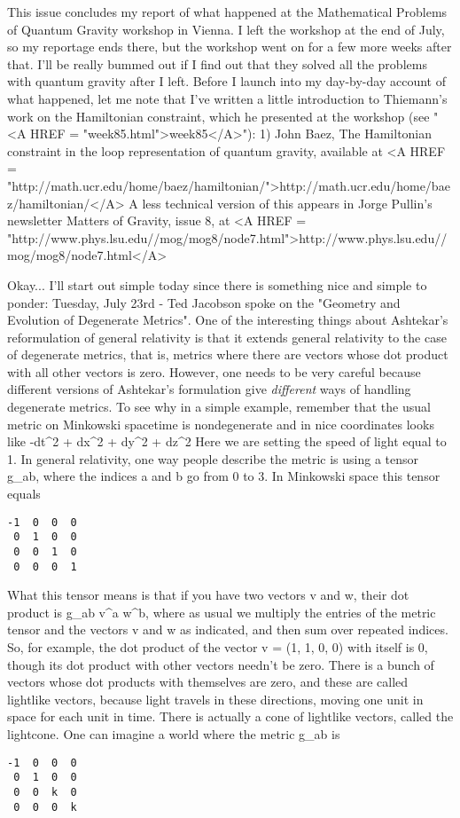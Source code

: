 

This issue concludes my report of what happened at the
Mathematical Problems of Quantum Gravity workshop in Vienna.  I
left the workshop at the end of July, so my reportage ends there,
but the workshop went on for a few more weeks after that.  I'll
be really bummed out if I find out that they solved all the
problems with quantum gravity after I left.
Before I launch into my day-by-day account of what happened,
let me note that I've written a little introduction to Thiemann's
work on the Hamiltonian constraint, which he presented at the
workshop (see "<A HREF = "week85.html">week85</A>"):
1) John Baez, The Hamiltonian constraint in the loop
representation of quantum gravity, available 
at <A HREF =
"http://math.ucr.edu/home/baez/hamiltonian/">http://math.ucr.edu/home/baez/hamiltonian/</A>
 A less technical version of this appears in Jorge Pullin's 
newsletter Matters of Gravity, issue 8, at
<A HREF = "http://www.phys.lsu.edu//mog/mog8/node7.html">http://www.phys.lsu.edu//mog/mog8/node7.html</A>

Okay... I'll start out simple today since there is something nice
and simple to ponder:
Tuesday, July 23rd - Ted Jacobson spoke on the "Geometry and
Evolution of Degenerate Metrics".  One of the interesting things
about Ashtekar's reformulation of general relativity is that it
extends general relativity to the case of degenerate metrics,
that is, metrics where there are vectors whose dot product
with all other vectors is zero.   However, one needs to be very
careful because different versions of Ashtekar's formulation give
\emph{different} ways of handling degenerate metrics.
To see why in a simple example, remember that the usual metric on
Minkowski spacetime is nondegenerate and in nice coordinates
looks like
-dt^2 + dx^2 + dy^2 + dz^2
Here we are setting the speed of light equal to 1.  In general
relativity, one way people describe the metric is using a tensor
g_{ab}, where the indices a and b go from 0 to 3.  In
Minkowski space this tensor equals
\begin{verbatim}
-1  0  0  0 
 0  1  0  0
 0  0  1  0
 0  0  0  1
\end{verbatim}
    
What this tensor means is that if you have two vectors v and w,
their dot product is g_{ab} v^a w^b, where as usual we multiply
the entries of the metric tensor and the vectors v and w as
indicated, and then sum over repeated indices.  So, for example,
the dot product of the vector 
v = (1, 1, 0, 0)
with itself is 0, though its dot product with other vectors
needn't be zero.   There is a bunch of vectors whose dot products
with themselves are zero, and these are called lightlike vectors,
because light travels in these directions, moving one unit in
space for each unit in time.   There is actually a cone of
lightlike vectors, called the lightcone.
One can imagine a world where the metric g_{ab} is
\begin{verbatim}
-1  0  0  0
 0  1  0  0
 0  0  k  0
 0  0  0  k
\end{verbatim}
    
